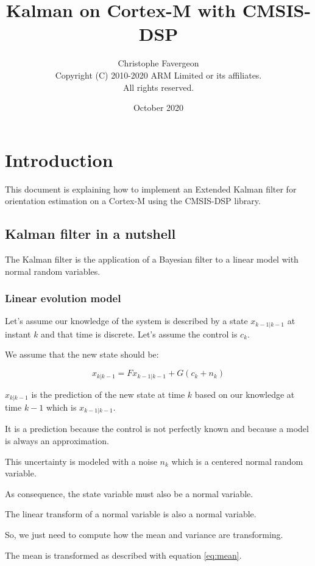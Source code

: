 \documentclass[titlepage,a4,12pt]{article}
\title{Kalman on Cortex-M with CMSIS-DSP}
\author{Christophe Favergeon \\ Copyright (C) 2010-2020 ARM Limited or its affiliates.\\ All rights reserved.}
\date{October 2020}
\numberwithin{equation}{subsection}
\newcommand{\curr}[1]{#1_{k-1|k-1}}
\newcommand{\before}[1]{#1_{k|k-1}}
\begin{document}
   \maketitle
\tableofcontents
\newpage
\section{Introduction}
 This document is explaining how to implement an Extended Kalman filter for orientation estimation on a Cortex-M using the CMSIS-DSP library.



\subsection{Kalman filter in a nutshell}

The Kalman filter is the application of a Bayesian filter to a linear  model with normal random variables.

\subsubsection{Linear evolution model}

Let's assume our knowledge of the system is described by a state $\curr{x}$ at instant $k$ and that time is discrete. Let's assume the control is $c_{k}$.

We assume that the new state should be:

\begin{equation} \label{eq:mean}
\before{x} = F\curr{x} + G (c_{k} + n_{k})
\end{equation}

$\before{x}$ is the prediction of the new state at time $k$ based on our knowledge at time $k-1$ which is $\curr{x}$.

It is a prediction because the control is not perfectly known and because a model is always an approximation.

This uncertainty is modeled with a noise $n_k$ which is a centered normal random variable.

As consequence, the state variable must also be a normal variable.

The linear transform of a normal variable is also a normal variable.

So, we just need to compute how the mean and variance are transforming.

The mean is transformed as described with equation \ref{eq:mean}.
\end{document}
